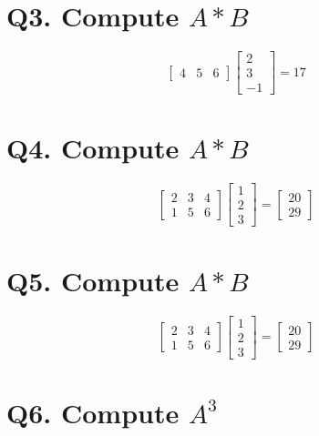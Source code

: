\documentclass[
  letterpaper,
  DIV=11,
  numbers=noendperiod]{scrartcl}
\begin{document}
\section{\texorpdfstring{Q3. Compute
\(A * B\)}{Q3. Compute A * B}}\label{q3.-compute-a-b}

\[
\begin{bmatrix}
4 & 5 & 6 \end{bmatrix}
\begin{bmatrix}
2\\3\\-1 \end{bmatrix} = 17
\]

\section{\texorpdfstring{Q4. Compute
\(A * B\)}{Q4. Compute A * B}}\label{q4.-compute-a-b}

\[
\begin{bmatrix}
2 & 3 & 4\\
1 & 5 & 6 \end{bmatrix} 
\begin{bmatrix}
1\\2\\3 \end{bmatrix} = \begin{bmatrix}
20\\29 \end{bmatrix}
\]

\section{\texorpdfstring{Q5. Compute
\(A * B\)}{Q5. Compute A * B}}\label{q5.-compute-a-b}

\[
\begin{bmatrix}
2 & 3 & 4\\
1 & 5 & 6\end{bmatrix}
\begin{bmatrix}
1\\2\\3\end{bmatrix} =
\begin{bmatrix}
20\\29 \end{bmatrix}
\]

\section{\texorpdfstring{Q6. Compute
\(A^3\)}{Q6. Compute A\^{}3}}\label{q6.-compute-a3}
\end{document}
